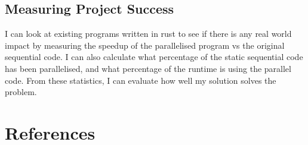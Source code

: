 \documentclass[12pt, a4paper]{article}
\begin{document}
\subsection{Measuring Project Success}

I can look at existing programs written in rust to see if there is any real world impact by measuring the speedup of the parallelised program vs the original sequential code. I can also calculate what percentage of the static sequential code has been parallelised, and what percentage of the runtime is using the parallel code. From these statistics, I can evaluate how well my solution solves the problem.

\section{References}
\printbibliography[heading=none]
\end{document}
